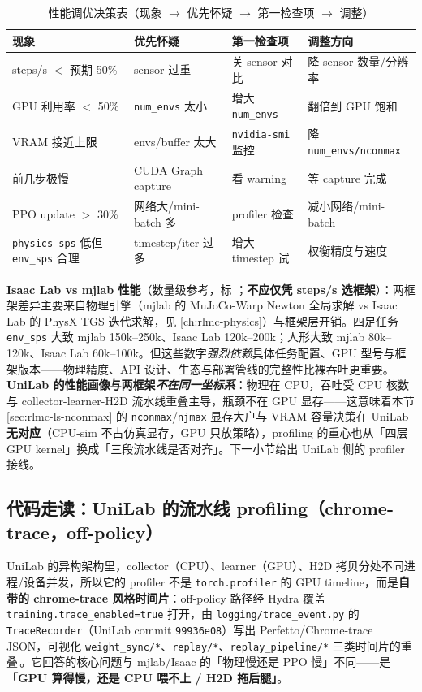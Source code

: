 \begin{table}[H]\centering\small
\caption{性能调优决策表（现象 $\to$ 优先怀疑 $\to$ 第一检查项 $\to$ 调整）}
\label{tab:rlmc-ls-perf-decision}
\begin{tabular}{@{}p{3.2cm}p{2.6cm}p{3.0cm}p{3.0cm}@{}}
\toprule
现象 & 优先怀疑 & 第一检查项 & 调整方向 \\
\midrule
steps/s $<$ 预期 50\% & sensor 过重 & 关 sensor 对比 & 降 sensor 数量/分辨率 \\
GPU 利用率 $<$ 50\% & \verb|num_envs| 太小 & 增大 \verb|num_envs| & 翻倍到 GPU 饱和 \\
VRAM 接近上限 & envs/buffer 太大 & \verb|nvidia-smi| 监控 & 降 \verb|num_envs/nconmax| \\
前几步极慢 & CUDA Graph capture & 看 warning & 等 capture 完成 \\
PPO update $>$ 30\% & 网络大/mini-batch 多 & profiler 检查 & 减小网络/mini-batch \\
\verb|physics_sps| 低但 \verb|env_sps| 合理 & timestep/iter 过多 & 增大 timestep 试 & 权衡精度与速度 \\
\bottomrule
\end{tabular}
\end{table}

\textbf{Isaac Lab vs mjlab 性能}（数量级参考，标 ；\textbf{不应仅凭 steps/s 选框架}）：两框架差异主要来自物理引擎（mjlab 的 MuJoCo-Warp Newton 全局求解 vs Isaac Lab 的 PhysX TGS 迭代求解，见 \cref{ch:rlmc-physics}）与框架层开销。四足任务 \verb|env_sps| 大致 mjlab 150k--250k、Isaac Lab 120k--200k；人形大致 mjlab 80k--120k、Isaac Lab 60k--100k。但这些数字\emph{强烈依赖}具体任务配置、GPU 型号与框架版本——物理精度、API 设计、生态与部署管线的完整性比裸吞吐更重要。\textbf{UniLab 的性能画像与两框架\emph{不在同一坐标系}}：物理在 CPU，吞吐受 CPU 核数与 collector-learner-H2D 流水线重叠主导，瓶颈不在 GPU 显存——这意味着本节 \cref{sec:rlmc-ls-nconmax} 的 \verb|nconmax|/\verb|njmax| 显存大户与 VRAM 容量决策在 UniLab \textbf{无对应}（CPU-sim 不占仿真显存，GPU 只放策略），profiling 的重心也从「四层 GPU kernel」换成「三段流水线是否对齐」。下一小节给出 UniLab 侧的 profiler 接线。

\subsection{代码走读：UniLab 的流水线 profiling（chrome-trace，off-policy）}
\label{sec:rlmc-ls-unilab-perf}

UniLab 的异构架构里，collector（CPU）、learner（GPU）、H2D 拷贝分处不同进程/设备并发，所以它的 profiler 不是 \verb|torch.profiler| 的 GPU timeline，而是\textbf{自带的 chrome-trace 风格时间片}：off-policy 路径经 Hydra 覆盖 \verb|training.trace_enabled=true| 打开，由 \verb|logging/trace_event.py| 的 \verb|TraceRecorder|（UniLab commit \texttt{99936e08}）写出 Perfetto/Chrome-trace JSON，可视化 \verb|weight_sync/*|、\verb|replay/*|、\verb|replay_pipeline/*| 三类时间片的重叠\,\cite{unilab2026}。它回答的核心问题与 mjlab/Isaac 的「物理慢还是 PPO 慢」不同——是\textbf{「GPU 算得慢，还是 CPU 喂不上 / H2D 拖后腿」}。

